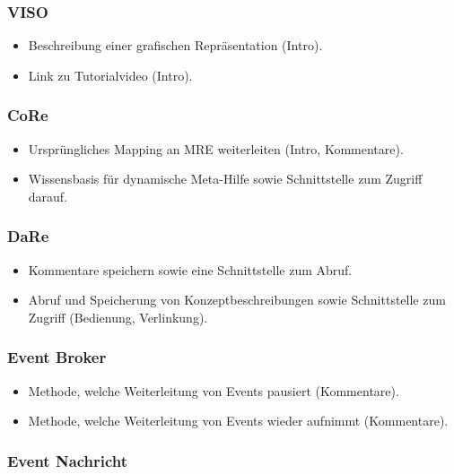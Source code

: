 \documentclass[
	headsepline,
	footsepline,
	fontsize=12pt,
	bibliography=totoc
]{scrbook}
\begin{document}
\subsubsection{VISO}

\begin{itemize}
	\item Beschreibung einer grafischen Repräsentation (Intro).
	\item Link zu Tutorialvideo (Intro).
\end{itemize}

\subsubsection{CoRe}

\begin{itemize}
	\item Ursprüngliches Mapping an MRE weiterleiten (Intro, Kommentare).
	\item Wissensbasis für dynamische Meta-Hilfe sowie Schnittstelle zum Zugriff darauf.
\end{itemize}

\subsubsection{DaRe}

\begin{itemize}
	\item Kommentare speichern sowie eine Schnittstelle zum Abruf.
	\item Abruf und Speicherung von Konzeptbeschreibungen sowie Schnittstelle zum Zugriff (Bedienung, Verlinkung).
\end{itemize}

\subsubsection{Event Broker}

\begin{itemize}
	\item Methode, welche Weiterleitung von Events pausiert (Kommentare).
	\item Methode, welche Weiterleitung von Events wieder aufnimmt (Kommentare).
\end{itemize}

\subsubsection{Event Nachricht}
\end{document}
